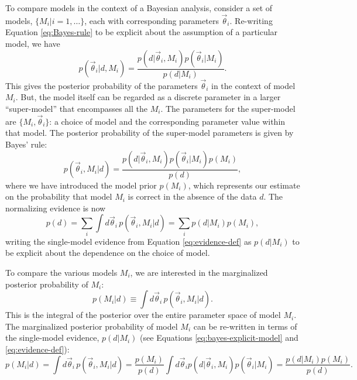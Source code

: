 \documentclass[preprint]{aastex}
\newcommand{\vtheta}{\vec{\theta}}
\begin{document}
To compare models in the context of a Bayesian analysis, consider a
set of models, $\{M_i| i = 1, \ldots\}$, each with corresponding
parameters $\vtheta_i$.  Re-writing Equation \eqref{eq:Bayes-rule} to
be explicit about the assumption of a particular model, we have
\begin{equation}
  p(\vtheta_i | d, M_i) = \frac{p(d|\vtheta_i, M_i) p(\vtheta_i | M_i)}{p(d|M_i)}.
\end{equation}
This gives the posterior probability of the parameters $\vtheta_i$ in
the context of model $M_i$.  But, the model itself can be regarded as
a discrete parameter in a larger ``super-model'' that encompasses all
the $M_i$.  The parameters for the super-model are $\{M_i,
\vtheta_i\}$: a choice of model and the corresponding parameter value
within that model.  The posterior probability of the super-model
parameters is given by Bayes' rule:
\begin{equation}
  \label{eq:bayes-explicit-model}
  p(\vtheta_i, M_i|d) = \frac{p(d|\vtheta_i, M_i) p(\vtheta_i |M_i) p(M_i)}{p(d)},
\end{equation}
where we have introduced the model prior $p(M_i)$, which represents
our estimate on the probability that model $M_i$ is correct in the
absence of the data $d$.  The normalizing evidence is now
\begin{equation}
  \label{eq:multi-model-evidence-def}
  p(d) = \sum_i \int d\vtheta_i\, p(\vtheta_i, M_i|d) = \sum_i
  p(d|M_i) p(M_i),
\end{equation}
writing the single-model evidence from Equation
\eqref{eq:evidence-def} as $p(d|M_i)$ to be explicit about the
dependence on the choice of model.

To compare the various models $M_i$, we are interested in the
marginalized posterior probability of $M_i$:
\begin{equation}
  \label{eq:model-posterior-def}
  p(M_i|d) \equiv \int d\vtheta_i\, p(\vtheta_i, M_i|d).
\end{equation}
This is the integral of the posterior over the entire parameter space
of model $M_i$.  The marginalized posterior probability of model $M_i$
can be re-written in terms of the single-model evidence, $p(d|M_i)$
(see Equations \eqref{eq:bayes-explicit-model} and
\eqref{eq:evidence-def}):
\begin{equation}
  \label{eq:model-evidence-def}
  p(M_i|d) = \int d\vtheta_i\, p(\vtheta_i, M_i|d) = \frac{p(M_i)}{p(d)} \int d\vtheta_i
  p(d|\vtheta_i,M_i) p(\vtheta_i|M_i) = \frac{p(d|M_i) p(M_i)}{p(d)}.
\end{equation}
\end{document}
